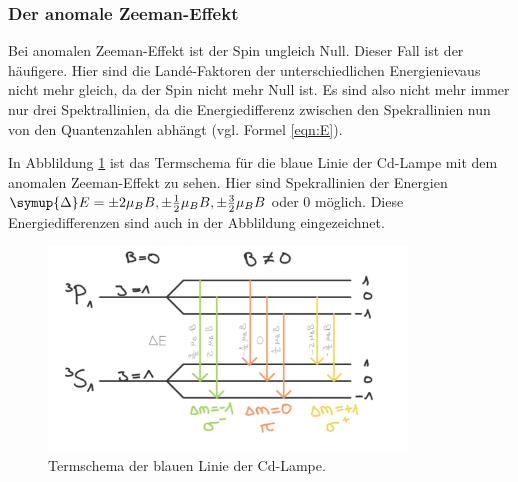 \subsubsection{Der anomale Zeeman-Effekt}

Bei anomalen Zeeman-Effekt ist der Spin ungleich Null. Dieser Fall ist der häufigere.
Hier sind die Landé-Faktoren der unterschiedlichen Energienievaus nicht mehr gleich, da der Spin nicht mehr Null ist. 
Es sind also nicht mehr immer nur drei Spektrallinien, da die Energiedifferenz zwischen den 
Spekrallinien nun von den Quantenzahlen abhängt (vgl. Formel \ref{eqn:E}). 

In Abblildung \ref{fig:blau} ist das Termschema für die blaue Linie der Cd-Lampe mit dem anomalen 
Zeeman-Effekt zu sehen. Hier sind Spekrallinien der Energien $\symup{\Delta}E = \pm 2 \mu_B B, \pm \frac{1}{2} \mu_B B, \pm \frac{3}{2} \mu_B B$ 
oder $0$ möglich. Diese Energiedifferenzen sind auch in der Abblildung eingezeichnet.

\begin{figure}
  \centering
  \includegraphics[width=0.85\textwidth]{blau2.png}
  \caption{Termschema der blauen Linie der Cd-Lampe.}
  \label{fig:blau}
\end{figure}
\FloatBarrier

